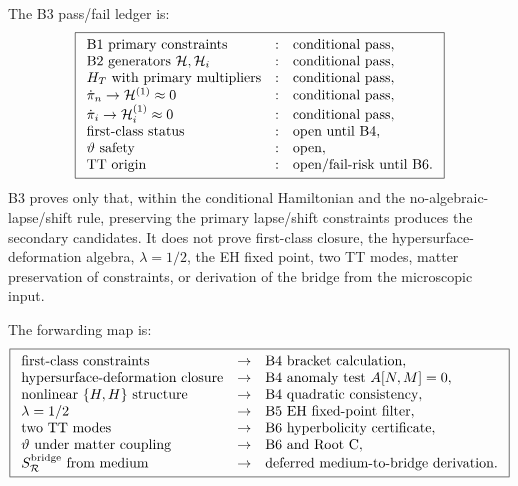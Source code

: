 \documentclass[11pt]{article}
\begin{document}
The B3 pass/fail ledger is:
\[
\boxed{
\begin{array}{lll}
\text{B1 primary constraints} &:& \text{conditional pass},\\
\text{B2 generators }{\cal H},{\cal H}_i &:& \text{conditional pass},\\
H_T\ \text{with primary multipliers} &:& \text{conditional pass},\\
\dot\pi_n\to{\cal H}^{(1)}\approx0 &:& \text{conditional pass},\\
\dot\pi_i\to{\cal H}_i^{(1)}\approx0 &:& \text{conditional pass},\\
\text{first-class status} &:& \text{open until B4},\\
\vartheta\ \text{safety} &:& \text{open},\\
\text{TT origin} &:& \text{open/fail-risk until B6}.
\end{array}}
\]
B3 proves only that, within the conditional Hamiltonian and the
no-algebraic-lapse/shift rule, preserving the primary lapse/shift constraints
produces the secondary candidates.  It does not prove first-class closure,
the hypersurface-deformation algebra, \(\lambda=1/2\), the EH fixed point, two
TT modes, matter preservation of constraints, or derivation of the bridge from
the microscopic input.

The forwarding map is:
\[
\boxed{
\begin{array}{lll}
\text{first-class constraints} &\to& \text{B4 bracket calculation},\\
\text{hypersurface-deformation closure} &\to& \text{B4 anomaly test }A[N,M]=0,\\
\text{nonlinear }\{H,H\}\text{ structure} &\to& \text{B4 quadratic consistency},\\
\lambda=1/2 &\to& \text{B5 EH fixed-point filter},\\
\text{two TT modes} &\to& \text{B6 hyperbolicity certificate},\\
\vartheta\text{ under matter coupling} &\to& \text{B6 and Root~C},\\
S_{\mathcal R}^{\rm bridge}\text{ from medium} &\to&
\text{deferred medium-to-bridge derivation}.
\end{array}}
\]
\end{document}
